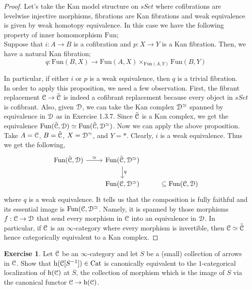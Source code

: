 \documentclass[10pt,a4paper,reqno,oneside]{book} %
\theoremstyle{plain}
\theoremstyle{definition}
\newtheorem{exercise}[thm]{Exercise}
\theoremstyle{remark}
\numberwithin{equation}{section}
\begin{document}
\begin{proof}
    Let's take the Kan model structure on $sSet$ where cofibrations are levelwise injective morphisms, fibrations are Kan fibrations and weak equivalence is given by weak homotopy equivalence. In this case we have the following property of inner homomorphism $\mathrm{Fun}$;\\
    Suppose that $i \colon A \to B$ is a  cofibration and $p \colon X \to Y$ is a Kan fibration. Then, we have a natural Kan fibration;
    \[ q \colon \mathrm{Fun}(B,X) \to 
    \mathrm{Fun}(A,X) \times_{\mathrm{Fun}(A,Y)} \mathrm{Fun}(B,Y) \]
    
    In particular, if either $i$ or $p$ is a weak equivalence, then $q$ is a trivial fibration. \\
    
    In order to apply this proposition, we need a few observation. First, the fibrant replacement $\mathcal C \to \tilde{\mathcal C}$ is indeed a cofibrant replacement because every object in $sSet$ is cofibrant. Also, given $\mathcal D$, we can take the Kan complex $\mathcal D^{\simeq}$ spanned by equivalence in $\mathcal D$ as in Exercise 1.3.7. Since $\tilde{\mathcal C}$ is a Kan complex, we get the equivalence $\operatorname{Fun}(\tilde{\mathcal C}, \mathcal D) \simeq \operatorname{Fun}(\tilde{\mathcal C}, \mathcal D^{\simeq})$. Now we can apply the above proposition. Take $A=\mathcal C$, $B=\tilde{\mathcal C}$, $X=\mathcal D^{\simeq}$, and $Y=*$. Clearly, $i$ is a weak equivalence. Thus we get the following,
    \[ \begin{tikzcd}
		\Fun(\tilde{\cC},\cD) \arrow{r}{\simeq} & \Fun(\tilde{\cC},\cD^{\simeq}) \arrow{d}{q} & {} \\
		{} & \Fun(\cC, \cD^{\simeq}) &\subseteq \Fun(\cC, \cD) 
	\end{tikzcd} \]
	where $q$ is a weak equivalence. It tells us that the composition is fully faithful and its essential image is $\operatorname{Fun}(\mathcal C, \mathcal D^{\simeq}$. Namely, it is spanned by those morphisms $f:\mathcal C \to \mathcal D$ that send every morphism in $\mathcal C$ into an equivalence in $\mathcal D$. In particular, if $\mathcal C$ is an $\infty$-category where every morphism is invertible, then $\mathcal C \simeq \tilde{\mathcal C}$ hence categorically equivalent to a Kan complex.
\end{proof}

\begin{exercise}
	Let $\mathcal C$ be an $\infty$-category and let $S$ be a (small) collection of arrows in $\mathcal C$.
	Show that $\mathrm h(\mathcal C[S^{-1}]) \in \mathrm{Cat}$ is canonically equivalent to the $1$-categorical localization of $\mathrm h(\mathcal C)$ at $\overline{S}$, the collection of morphism which is the image of $S$ via the canonical functor $\mathcal C \to \mathrm h(\mathcal C)$.
\end{exercise}
\end{document}
